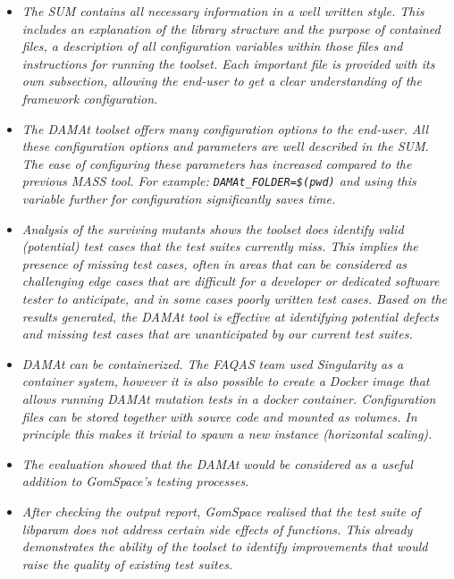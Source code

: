 \begin{itemize}
\item \emph{The SUM contains all necessary information in a well written style. This includes an explanation of the library structure and the purpose of contained files, a description of all configuration variables within those files and instructions for running the toolset. Each important file is provided with its own subsection, allowing the end-user to get a clear understanding of the framework configuration.}



\item \emph{The DAMAt toolset offers many configuration options to the end-user. All these configuration options and parameters are well described in the SUM. The ease of configuring these parameters has increased compared to the previous MASS tool. For example: \texttt{DAMAt\_FOLDER=\$(pwd)} and using this variable further for configuration significantly saves time.}



\item \emph{Analysis of the surviving mutants shows the toolset does identify valid (potential) test cases that the test suites currently miss. This implies the presence of missing test cases, often in areas that can be considered as challenging edge cases that are difficult for a developer or dedicated software tester to anticipate, and in some cases poorly written test cases. Based on the results generated, the DAMAt tool is effective at identifying potential defects and missing test cases that are unanticipated by our current test suites.}



\item \emph{DAMAt can be containerized. The FAQAS team used Singularity as a container system, however it is also possible to create a Docker image that allows running DAMAt mutation tests in a docker container. Configuration files can be stored together with source code and mounted as volumes. In principle this makes it trivial to spawn a new instance (horizontal scaling).}



\item \emph{The evaluation showed that the DAMAt would be considered as a useful addition to GomSpace’s testing processes.}



\item \emph{After checking the output report, GomSpace realised that the test suite of libparam does not address certain side effects of functions. This already demonstrates the ability of the toolset to identify improvements that would raise the quality of existing test suites.}




\end{itemize}
